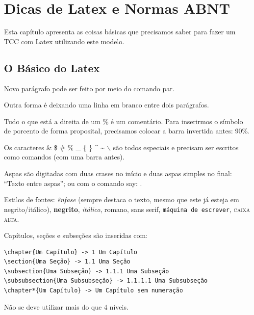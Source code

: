 \chapter{Dicas de Latex e Normas ABNT}
Esta capítulo apresenta as coisas básicas que precisamos saber para fazer um TCC com Latex utilizando este modelo.

\section{O Básico do Latex}
Novo parágrafo pode ser feito por meio do comando par. \par
Outra forma é deixando uma linha em branco entre dois parágrafos.

Tudo o que está a direita de um \% é um comentário.
Para inserirmos o símbolo de porcento de forma proposital, precisamos colocar a barra invertida antes: 90\%.

Os caracteres \& \$ \# \% \_ \{ \} \^{} \~{} $\backslash$ são todos especiais e precisam ser escritos como comandos (com uma barra antes).

Aspas são digitadas com duas crases no início e duas aspas simples no final: ``Texto entre aspas''; ou com o comando say: .

Estilos de fontes: \emph{ênfase} (sempre destaca o texto, mesmo que este já esteja em negrito/itálico), \textbf{negrito}, \textit{itálico}, \textrm{romano}, \textsf{sans serif}, \texttt{máquina de escrever}, \textsc{caixa alta}.

Capítulos, seções e subseções são inseridas com:
\begin{verbatim}
\chapter{Um Capítulo} -> 1 Um Capítulo
\section{Uma Seção} -> 1.1 Uma Seção
\subsection{Uma Subseção} -> 1.1.1 Uma Subseção
\subsubsection{Uma Subsubseção} -> 1.1.1.1 Uma Subsubseção
\chapter*{Um Capítulo} -> Um Capítulo sem numeração
\end{verbatim}
Não se deve utilizar mais do que 4 níveis.

